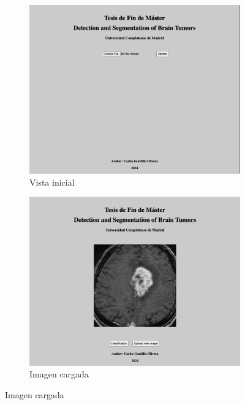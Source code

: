 \begin{figure}[H]
    \centering
    \begin{subfigure}[b]{0.45\textwidth}
        \centering
        \includegraphics[width=\textwidth]{chapters/api/images/home.png}
        \caption{Vista inicial}
        \label{fig:imagen1}
    \end{subfigure}
    \hfill
    \begin{subfigure}[b]{0.45\textwidth}
        \centering
        \includegraphics[width=\textwidth]{chapters/api/images/image.png}
        \caption{Imagen cargada}
        \label{fig:imagen2}
    \end{subfigure}
    

\end{figure}
